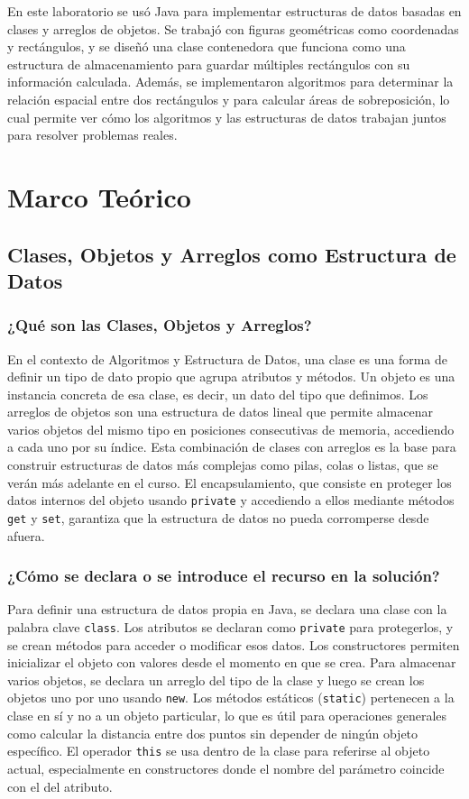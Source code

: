 \documentclass[12pt]{article}
\begin{document}
En este laboratorio se usó Java para implementar estructuras 
de datos basadas en clases y arreglos de objetos. Se trabajó 
con figuras geométricas como coordenadas y rectángulos, y se 
diseñó una clase contenedora que funciona como una estructura 
de almacenamiento para guardar múltiples rectángulos con su 
información calculada. Además, se implementaron algoritmos 
para determinar la relación espacial entre dos rectángulos y 
para calcular áreas de sobreposición, lo cual permite ver 
cómo los algoritmos y las estructuras de datos trabajan 
juntos para resolver problemas reales.

\newpage
\section{Marco Teórico}
\subsection{Clases, Objetos y Arreglos como Estructura de Datos}
\subsubsection{¿Qué son las Clases, Objetos y Arreglos?}
En el contexto de Algoritmos y Estructura de Datos, una clase 
es una forma de definir un tipo de dato propio que agrupa 
atributos y métodos. Un objeto es una instancia concreta de esa clase, es 
decir, un dato del tipo que definimos. Los arreglos de objetos 
son una estructura de datos lineal que permite almacenar 
varios objetos del mismo tipo en posiciones consecutivas de 
memoria, accediendo a cada uno por su índice. Esta combinación 
de clases con arreglos es la base para construir estructuras 
de datos más complejas como pilas, colas o listas, que se 
verán más adelante en el curso. El encapsulamiento, que 
consiste en proteger los datos internos del objeto usando 
\texttt{private} y accediendo a ellos mediante métodos 
\texttt{get} y \texttt{set}, garantiza que la estructura de 
datos no pueda corromperse desde afuera.

\subsubsection{¿Cómo se declara o se introduce el recurso 
en la solución?}
Para definir una estructura de datos propia en Java, se 
declara una clase con la palabra clave \texttt{class}. 
Los atributos se declaran como \texttt{private} para 
protegerlos, y se crean métodos para acceder o modificar 
esos datos. Los constructores permiten inicializar el objeto 
con valores desde el momento en que se crea. Para almacenar 
varios objetos, se declara un arreglo del tipo de la clase 
y luego se crean los objetos uno por uno usando \texttt{new}.
Los métodos estáticos (\texttt{static}) pertenecen a la clase 
en sí y no a un objeto particular, lo que es útil para 
operaciones generales como calcular la distancia entre dos 
puntos sin depender de ningún objeto específico. El operador 
\texttt{this} se usa dentro de la clase para referirse al 
objeto actual, especialmente en constructores donde el nombre 
del parámetro coincide con el del atributo.
\end{document}

